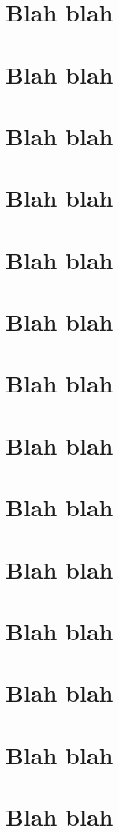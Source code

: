 \documentclass{article}
\begin{document}
    \section{Blah blah}
    \clearpage
    \section{Blah blah}
    \clearpage
    \section{Blah blah}
    \clearpage
    \section{Blah blah}
    \clearpage
    \section{Blah blah}
    \clearpage
    \section{Blah blah}
    \clearpage
    \section{Blah blah}
    \clearpage
    \section{Blah blah}
    \clearpage
    \section{Blah blah}
    \clearpage
    \section{Blah blah}
    \clearpage
    \section{Blah blah}
    \clearpage
    \section{Blah blah}
    \clearpage
    \section{Blah blah}
    \clearpage
    \section{Blah blah}
    \clearpage
\end{document}

